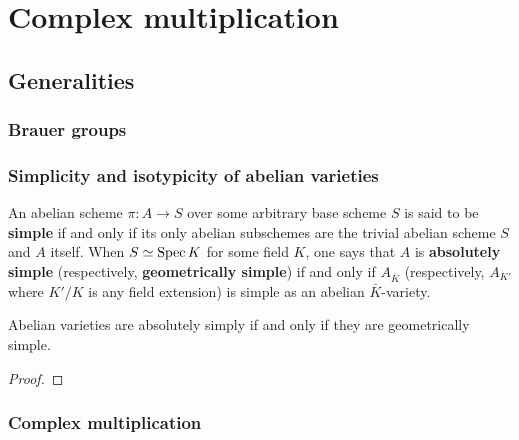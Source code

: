 \section{Complex multiplication}
    \subsection{Generalities}
        \subsubsection{Brauer groups}
    
        \subsubsection{Simplicity and isotypicity of abelian varieties}
            \begin{definition} \label{def: simple_abelian_varieties}
                An abelian scheme $\pi: A \to S$ over some arbitrary base scheme $S$ is said to be \textbf{simple} if and only if its only abelian subschemes are the trivial abelian scheme $S$ and $A$ itself. When $S \simeq \operatorname{Spec} K$ for some field $K$, one says that $A$ is \textbf{absolutely simple} (respectively, \textbf{geometrically simple}) if and only if $A_{\bar{K}}$ (respectively, $A_{K'}$ where $K'/K$ is any field extension) is simple as an abelian $\bar{K}$-variety.
            \end{definition}
            \begin{proposition} \label{prop: absolutely_simple_iff_geometrically_simple}
                Abelian varieties are absolutely simply if and only if they are geometrically simple.
            \end{proposition}
                \begin{proof}
                    
                \end{proof}
        
        \subsubsection{Complex multiplication}